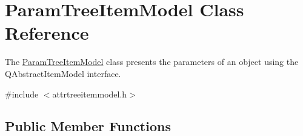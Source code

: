 \hypertarget{class_param_tree_item_model}{\section{\-Param\-Tree\-Item\-Model \-Class \-Reference}
\label{class_param_tree_item_model}
}


\-The \hyperlink{class_param_tree_item_model}{\-Param\-Tree\-Item\-Model} class presents the parameters of an object using the \-Q\-Abstract\-Item\-Model interface.  




{\ttfamily \#include $<$attrtreeitemmodel.\-h$>$}

\subsection*{\-Public \-Member \-Functions}
